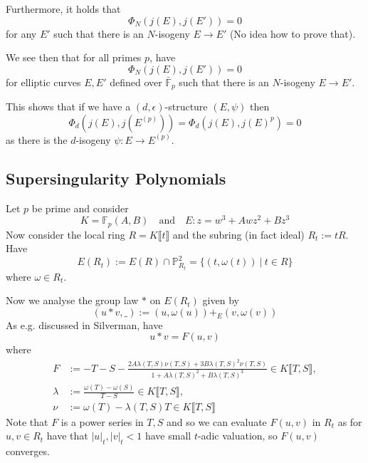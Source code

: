 \documentclass{scrartcl}
\newcommand{\F}{\mathbb{F}}
\theoremstyle{definition}
\begin{document}
Furthermore, it holds that
\begin{equation*}
    \Phi_N(j(E), j(E')) = 0
\end{equation*}
for any $E'$ such that there is an $N$-isogeny $E \to E'$ (No idea how to prove that).

We see then that for all primes $p$, have
\begin{equation*}
    \Phi_N(j(E), j(E')) = 0
\end{equation*}
for elliptic curves $E, E'$ defined over $\bar{\F}_p$ such that there is an $N$-isogeny $E \to E'$.

This shows that if we have a $(d, \epsilon)$-structure $(E, \psi)$ then
\begin{equation*}
    \Phi_d(j(E), j(E^{(p)})) = \Phi_d(j(E), j(E)^p) = 0
\end{equation*}
as there is the $d$-isogeny $\psi: E \to E^{(p)}$.

\subsection{Supersingularity Polynomials}
Let $p$ be prime and consider
\begin{equation*}
    K = \F_p(A, B) \quad \text{and} \quad E: z = w^3 + Awz^2 + Bz^3
\end{equation*}
Now consider the local ring $R = K\llbracket t \rrbracket$ and the subring (in fact ideal) $R_t := tR$.
Have
\begin{equation*}
    E(R_t) := E(R) \cap \mathbb{P}_{R_t}^2 = \{ (t, \omega(t)) \ | \ t \in R \}
\end{equation*}
where $\omega \in R_t$.

Now we analyse the group law $*$ on $E(R_t)$ given by
\begin{equation*}
    (u * v, \_) := (u, \omega(u)) +_E (v, \omega(v))
\end{equation*}
As e.g. discussed in Silverman, have
\begin{equation*}
    u * v = F(u, v)
\end{equation*}
where
\begin{align*}
    F &:= -T - S - \frac {2A \lambda(T, S) \nu(T, S) + 3B \lambda(T, S)^2 \nu(T, S)} {1 + A \lambda(T, S)^2 + B \lambda(T, S)^3} \in K\llbracket T, S \rrbracket, \\
    \lambda &:= \frac {\omega(T) - \omega(S)} {T - S} \in K\llbracket T, S \rrbracket, \\
    \nu &:= \omega(T) - \lambda(T, S)T \in K\llbracket T, S \rrbracket
\end{align*}
Note that $F$ is a power series in $T, S$ and so we can evaluate $F(u, v)$ in $R_t$ as for $u, v \in R_t$ have that $|u|_t, |v|_t < 1$ have small $t$-adic valuation, so $F(u, v)$ converges.
\end{document}
